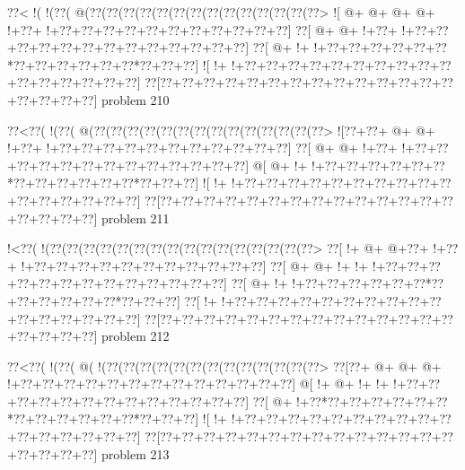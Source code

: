 \vbox{\vbox{\goo
\0??<\- !(\- !(\0??(\- @(\0??(\0??(\0??(\0??(\0??(\0??(\0??(\0??(\0??(\0??(\0??(\0??(\0??(\0??>
\- ![\- @+\- @+\- @+\- @+\- !+\0??+\- !+\0??+\0??+\0??+\0??+\0??+\0??+\0??+\0??+\0??+\0??+\0??]
\0??[\- @+\- @+\- !+\0??+\- !+\0??+\0??+\0??+\0??+\0??+\0??+\0??+\0??+\0??+\0??+\0??+\0??+\0??]
\0??[\- @+\- !+\- !+\0??+\0??+\0??+\0??+\0??+\0??*\0??+\0??+\0??+\0??+\0??+\0??*\0??+\0??+\0??]
\- ![\- !+\- !+\0??+\0??+\0??+\0??+\0??+\0??+\0??+\0??+\0??+\0??+\0??+\0??+\0??+\0??+\0??+\0??]
\0??[\0??+\0??+\0??+\0??+\0??+\0??+\0??+\0??+\0??+\0??+\0??+\0??+\0??+\0??+\0??+\0??+\0??+\0??]
}
\hfil problem 210\hfil\break
}



\vbox{\vbox{\goo
\0??<\0??(\- !(\0??(\- @(\0??(\0??(\0??(\0??(\0??(\0??(\0??(\0??(\0??(\0??(\0??(\0??(\0??(\0??>
\- ![\0??+\0??+\- @+\- @+\- !+\0??+\- !+\0??+\0??+\0??+\0??+\0??+\0??+\0??+\0??+\0??+\0??+\0??]
\0??[\- @+\- @+\- !+\0??+\- !+\0??+\0??+\0??+\0??+\0??+\0??+\0??+\0??+\0??+\0??+\0??+\0??+\0??]
\- @[\- @+\- !+\- !+\0??+\0??+\0??+\0??+\0??+\0??*\0??+\0??+\0??+\0??+\0??+\0??*\0??+\0??+\0??]
\- ![\- !+\- !+\0??+\0??+\0??+\0??+\0??+\0??+\0??+\0??+\0??+\0??+\0??+\0??+\0??+\0??+\0??+\0??]
\0??[\0??+\0??+\0??+\0??+\0??+\0??+\0??+\0??+\0??+\0??+\0??+\0??+\0??+\0??+\0??+\0??+\0??+\0??]
}
\hfil problem 211\hfil\break
}



\vbox{\vbox{\goo
\- !<\0??(\- !(\0??(\0??(\0??(\0??(\0??(\0??(\0??(\0??(\0??(\0??(\0??(\0??(\0??(\0??(\0??(\0??>
\0??[\- !+\- @+\- @+\0??+\- !+\0??+\- !+\0??+\0??+\0??+\0??+\0??+\0??+\0??+\0??+\0??+\0??+\0??]
\0??[\- @+\- @+\- !+\- !+\- !+\0??+\0??+\0??+\0??+\0??+\0??+\0??+\0??+\0??+\0??+\0??+\0??+\0??]
\0??[\- @+\- !+\- !+\0??+\0??+\0??+\0??+\0??+\0??*\0??+\0??+\0??+\0??+\0??+\0??*\0??+\0??+\0??]
\0??[\- !+\- !+\0??+\0??+\0??+\0??+\0??+\0??+\0??+\0??+\0??+\0??+\0??+\0??+\0??+\0??+\0??+\0??]
\0??[\0??+\0??+\0??+\0??+\0??+\0??+\0??+\0??+\0??+\0??+\0??+\0??+\0??+\0??+\0??+\0??+\0??+\0??]
}
\hfil problem 212\hfil\break
}



\vbox{\vbox{\goo
\0??<\0??(\- !(\0??(\- @(\- !(\0??(\0??(\0??(\0??(\0??(\0??(\0??(\0??(\0??(\0??(\0??(\0??(\0??>
\0??[\0??+\- @+\- @+\- @+\- !+\0??+\0??+\0??+\0??+\0??+\0??+\0??+\0??+\0??+\0??+\0??+\0??+\0??]
\- @[\- !+\- @+\- !+\- !+\- !+\0??+\0??+\0??+\0??+\0??+\0??+\0??+\0??+\0??+\0??+\0??+\0??+\0??]
\0??[\- @+\- !+\0??*\0??+\0??+\0??+\0??+\0??+\0??*\0??+\0??+\0??+\0??+\0??+\0??*\0??+\0??+\0??]
\- ![\- !+\- !+\0??+\0??+\0??+\0??+\0??+\0??+\0??+\0??+\0??+\0??+\0??+\0??+\0??+\0??+\0??+\0??]
\0??[\0??+\0??+\0??+\0??+\0??+\0??+\0??+\0??+\0??+\0??+\0??+\0??+\0??+\0??+\0??+\0??+\0??+\0??]
}
\hfil problem 213\hfil\break
}



